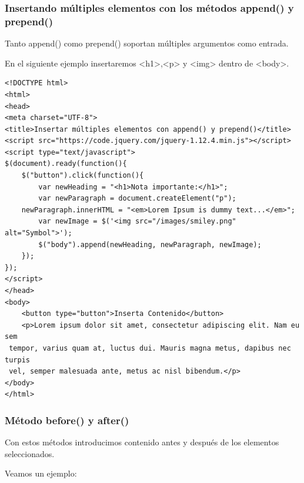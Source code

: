 \documentclass[a4paper, oneside]{article}
\begin{document}
\subsubsection{Insertando múltiples elementos con los métodos append() y prepend()}
\label{sec:org8365e57}

Tanto append() como prepend() soportan múltiples argumentos como entrada. 

En el siguiente ejemplo insertaremos <h1>,<p> y <img> dentro de <body>.

\begin{verbatim}
<!DOCTYPE html>
<html>
<head>
<meta charset="UTF-8">
<title>Insertar múltiples elementos con append() y prepend()</title>
<script src="https://code.jquery.com/jquery-1.12.4.min.js"></script>
<script type="text/javascript">
$(document).ready(function(){
    $("button").click(function(){
        var newHeading = "<h1>Nota importante:</h1>";
        var newParagraph = document.createElement("p");
    newParagraph.innerHTML = "<em>Lorem Ipsum is dummy text...</em>";
        var newImage = $('<img src="/images/smiley.png" alt="Symbol">');
        $("body").append(newHeading, newParagraph, newImage);
    });
});
</script>
</head>
<body>
    <button type="button">Inserta Contenido</button>
    <p>Lorem ipsum dolor sit amet, consectetur adipiscing elit. Nam eu sem
 tempor, varius quam at, luctus dui. Mauris magna metus, dapibus nec turpis
 vel, semper malesuada ante, metus ac nisl bibendum.</p>
</body>
</html>                                		
\end{verbatim}

\subsubsection{Método before() y after()}
\label{sec:org89d5eba}

Con estos métodos introducimos contenido antes y después de los elementos seleccionados.

Veamos un ejemplo:
\end{document}
